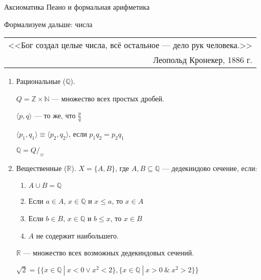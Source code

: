 \documentclass[aspectratio=169]{beamer}
\begin{document}
\begin{frame}
\begin{center}{\LARGE Аксиоматика Пеано и формальная арифметика}\end{center}

\end{frame}


\begin{frame}{Формализуем дальше: числа}

{\itshape \hfill \begin{tabular}{r} <<Бог создал целые числа, всё остальное — дело рук человека.>>\\
                                 Леопольд Кронекер, 1886 г.\end{tabular}}\pause
\begin{enumerate}
\item Рациональные ($\mathbb{Q}$).\pause

      $Q = \mathbb{Z} \times \mathbb{N}$ --- множество всех простых дробей.\pause

      $\langle p,q \rangle$ --- то же, что $\frac{p}{q}$ \pause

      $\langle p_1,q_1 \rangle \equiv \langle p_2, q_2 \rangle$, если $p_1q_2 = p_2q_1$\pause

\vspace{0.1cm}
      $\mathbb{Q} = Q/_\equiv$

\item Вещественные ($\mathbb{R}$). \pause $X = \{ A, B \}$, где $A,B \subseteq \mathbb{Q}$ --- дедекиндово сечение, если:\pause
\begin{enumerate}
\item $A\cup B = \mathbb{Q}$\pause
\item Если $a \in A$, $x \in \mathbb{Q}$ и $x \le a$, то $x \in A$\pause
\item Если $b \in B$, $x \in \mathbb{Q}$ и $b \le x$, то $x \in B$\pause
\item $A$ не содержит наибольшего.\pause
\end{enumerate}

       $\mathbb{R}$ --- множество всех возможных дедекиндовых сечений. \pause

$\sqrt 2 = \{\{ x\in\mathbb{Q}\ |\ x < 0 \vee x^2 < 2 \}, \{ x\in\mathbb{Q}\ |\ x > 0 \ \& \ x^2 > 2\}\}$
\end{enumerate}
\end{frame}
\end{document}
